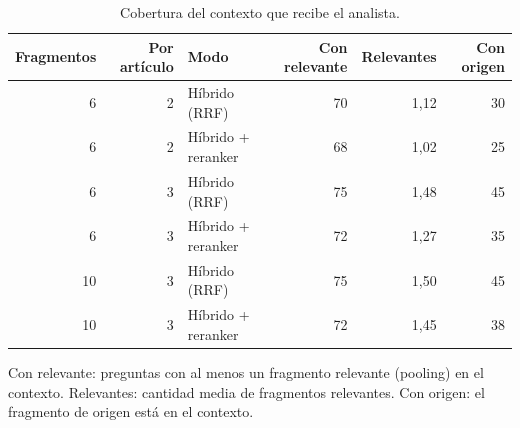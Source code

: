 \begin{table}[htbp]
\centering
\small
\caption{Cobertura del contexto que recibe el analista.}
\label{tab:contexto}
\begin{tabular}{rrlrrr}
\toprule
\textbf{Fragmentos} & \textbf{Por artículo} & \textbf{Modo} & \textbf{Con relevante} & \textbf{Relevantes} & \textbf{Con origen} \\
\midrule
6 & 2 & Híbrido (RRF) & 70 & 1,12 & 30 \\
6 & 2 & Híbrido + reranker & 68 & 1,02 & 25 \\
6 & 3 & Híbrido (RRF) & 75 & 1,48 & 45 \\
6 & 3 & Híbrido + reranker & 72 & 1,27 & 35 \\
10 & 3 & Híbrido (RRF) & 75 & 1,50 & 45 \\
10 & 3 & Híbrido + reranker & 72 & 1,45 & 38 \\
\bottomrule
\end{tabular}
\par\smallskip\parbox{0.92\linewidth}{\footnotesize Con relevante: preguntas con al menos un fragmento relevante (pooling) en el contexto. Relevantes: cantidad media de fragmentos relevantes. Con origen: el fragmento de origen está en el contexto.}
\end{table}
